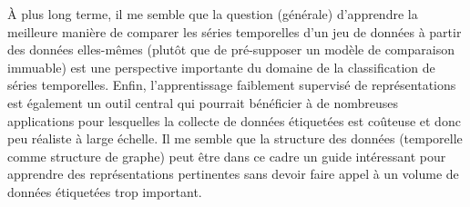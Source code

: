 À plus long terme, il me semble que la question (générale) d'apprendre
la meilleure manière de comparer les séries temporelles d'un jeu de données à
partir des données elles-mêmes (plutôt que de pré-supposer un modèle de
comparaison immuable) est une perspective importante du domaine de la
classification de séries temporelles.
Enfin, l'apprentissage faiblement supervisé de représentations
est également un outil central qui pourrait bénéficier à de nombreuses
applications pour lesquelles la collecte de données étiquetées est coûteuse et
donc peu réaliste à large échelle.
Il me semble que la structure des données (temporelle
comme structure de graphe) peut être dans ce cadre un guide intéressant pour
apprendre des représentations pertinentes sans devoir faire appel à un volume de
données étiquetées trop important.
